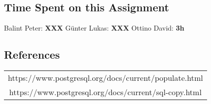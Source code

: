 \documentclass[11pt]{scrartcl}
\begin{document}
\subsection*{Time Spent on this Assignment}

Balint Peter: \textbf{XXX}
Günter Lukas:  \textbf{XXX}
Ottino David: \textbf{3h}

\subsection*{References}

\begin{table}[H]
  \centering
  \begin{tabular}{c}
    \hline
    https://www.postgresql.org/docs/current/populate.html \tabularnewline
    https://www.postgresql.org/docs/current/sql-copy.html \tabularnewline
    \hline
  \end{tabular}
\end{table}
\end{document}
